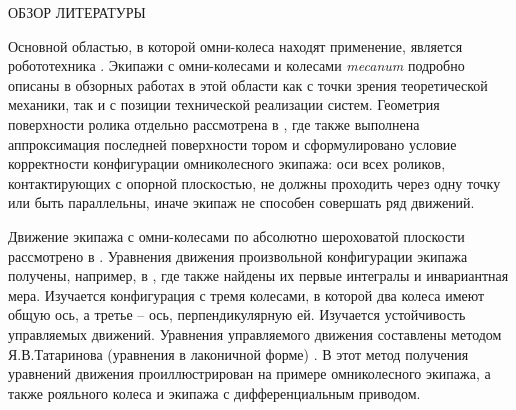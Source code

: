 ОБЗОР ЛИТЕРАТУРЫ


Основной областью, в которой омни-колеса находят применение, является робототехника \cite{Seeni2010,Martynenko2005,Martynenko2007,GolubevSnake2004}. Экипажи с омни-колесами и колесами \textit{mecanum} \cite{Ilon} подробно описаны в обзорных работах в этой области \cite{Campion1996,Zimmermann2009,ChungIagnemma2016,Kanjanawanishkul2015,Adascalitei2011} как с точки зрения теоретической механики, так и с позиции технической реализации систем. Геометрия поверхности ролика отдельно рассмотрена в \cite{Gfrerrer2008}, где также выполнена аппроксимация последней поверхности тором и сформулировано условие корректности конфигурации омниколесного экипажа: оси всех роликов, контактирующих с опорной плоскостью, не должны проходить через одну точку или быть параллельны, иначе экипаж не способен совершать ряд движений.

Движение экипажа с омни-колесами по абсолютно шероховатой плоскости рассмотрено в \cite{ZobovaTatarinovAspecty2006,zobova2008svobodnye8020851,ZobovaTatarinovPMM,Zobova2011e}. Уравнения движения произвольной конфигурации экипажа получены, например, в \cite{ZobovaTatarinovPMM}, где также найдены их первые интегралы и инвариантная мера. Изучается конфигурация с тремя колесами, в которой два колеса имеют общую ось, а третье -- ось, перпендикулярную ей. Изучается устойчивость управляемых движений. Уравнения управляемого движения составлены методом Я.В.Татаринова (уравнения в лаконичной форме) \cite{Tatarinov,Tatarinov2005}. В \cite{Zobova2011} этот метод получения уравнений движения  проиллюстрирован на примере омниколесного экипажа, а также рояльного колеса и экипажа с дифференциальным приводом.


